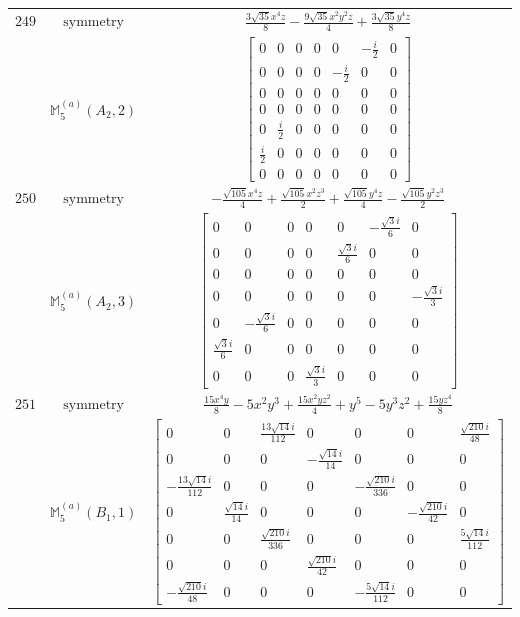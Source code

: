 \documentclass[fleqn,8pt,landscape]{jsarticle}
\begin{document}
\begin{longtable}{ccc}
$ 249 $ & $ \text{symmetry} $ & $ \frac{3 \sqrt{35} x^{4} z}{8} - \frac{9 \sqrt{35} x^{2} y^{2} z}{4} + \frac{3 \sqrt{35} y^{4} z}{8} $ \\
$  $ & $ \mathbb{M}_{5}^{(a)}(A_{2},2) $ & $ \begin{bmatrix} 0 & 0 & 0 & 0 & 0 & - \frac{i}{2} & 0 \\ 0 & 0 & 0 & 0 & - \frac{i}{2} & 0 & 0 \\ 0 & 0 & 0 & 0 & 0 & 0 & 0 \\ 0 & 0 & 0 & 0 & 0 & 0 & 0 \\ 0 & \frac{i}{2} & 0 & 0 & 0 & 0 & 0 \\ \frac{i}{2} & 0 & 0 & 0 & 0 & 0 & 0 \\ 0 & 0 & 0 & 0 & 0 & 0 & 0 \end{bmatrix} $ \\ \hline
$ 250 $ & $ \text{symmetry} $ & $ - \frac{\sqrt{105} x^{4} z}{4} + \frac{\sqrt{105} x^{2} z^{3}}{2} + \frac{\sqrt{105} y^{4} z}{4} - \frac{\sqrt{105} y^{2} z^{3}}{2} $ \\
$  $ & $ \mathbb{M}_{5}^{(a)}(A_{2},3) $ & $ \begin{bmatrix} 0 & 0 & 0 & 0 & 0 & - \frac{\sqrt{3} i}{6} & 0 \\ 0 & 0 & 0 & 0 & \frac{\sqrt{3} i}{6} & 0 & 0 \\ 0 & 0 & 0 & 0 & 0 & 0 & 0 \\ 0 & 0 & 0 & 0 & 0 & 0 & - \frac{\sqrt{3} i}{3} \\ 0 & - \frac{\sqrt{3} i}{6} & 0 & 0 & 0 & 0 & 0 \\ \frac{\sqrt{3} i}{6} & 0 & 0 & 0 & 0 & 0 & 0 \\ 0 & 0 & 0 & \frac{\sqrt{3} i}{3} & 0 & 0 & 0 \end{bmatrix} $ \\ \hline
$ 251 $ & $ \text{symmetry} $ & $ \frac{15 x^{4} y}{8} - 5 x^{2} y^{3} + \frac{15 x^{2} y z^{2}}{4} + y^{5} - 5 y^{3} z^{2} + \frac{15 y z^{4}}{8} $ \\
$  $ & $ \mathbb{M}_{5}^{(a)}(B_{1},1) $ & $ \begin{bmatrix} 0 & 0 & \frac{13 \sqrt{14} i}{112} & 0 & 0 & 0 & \frac{\sqrt{210} i}{48} \\ 0 & 0 & 0 & - \frac{\sqrt{14} i}{14} & 0 & 0 & 0 \\ - \frac{13 \sqrt{14} i}{112} & 0 & 0 & 0 & - \frac{\sqrt{210} i}{336} & 0 & 0 \\ 0 & \frac{\sqrt{14} i}{14} & 0 & 0 & 0 & - \frac{\sqrt{210} i}{42} & 0 \\ 0 & 0 & \frac{\sqrt{210} i}{336} & 0 & 0 & 0 & \frac{5 \sqrt{14} i}{112} \\ 0 & 0 & 0 & \frac{\sqrt{210} i}{42} & 0 & 0 & 0 \\ - \frac{\sqrt{210} i}{48} & 0 & 0 & 0 & - \frac{5 \sqrt{14} i}{112} & 0 & 0 \end{bmatrix} $ \\ \hline

\end{longtable}
\end{document}
